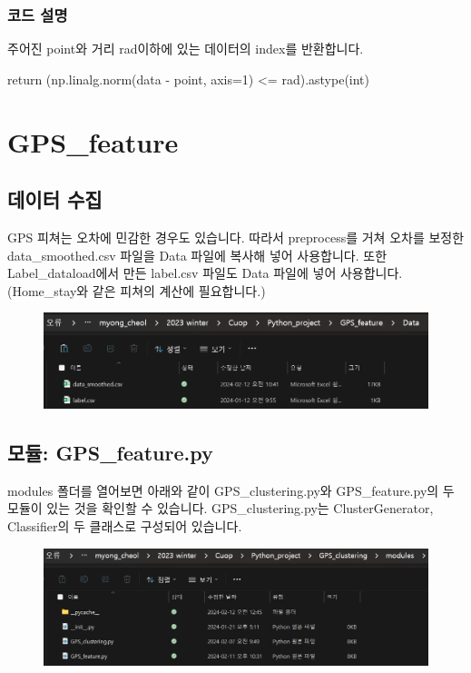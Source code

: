 \documentclass{oblivoir}
\begin{document}
  \subsection{코드 설명}
  주어진 point와 거리 rad이하에 있는 데이터의 index를 반환합니다.
  \begin{python}[label={GPS_clustering_26}]
    return (np.linalg.norm(data - point, axis=1) <= rad).astype(int)
  \end{python}

  \chapter{GPS\_feature}
  \setcounter{section}{0}
  \section{데이터 수집}
  GPS 피쳐는 오차에 민감한 경우도 있습니다. 따라서 preprocess를 거쳐 오차를 보정한 data\_smoothed.csv 파일을 Data 파일에 복사해 넣어 사용합니다.
  또한 Label\_dataload에서 만든 label.csv 파일도 Data 파일에 넣어 사용합니다.(Home\_stay와 같은 피쳐의 계산에 필요합니다.)
  \begin{figure}[H]
    \includegraphics[width=\textwidth]{GPS_feature_1.png}
  \end{figure}

  \section{모듈: GPS\_feature.py}
  modules 폴더를 열어보면 아래와 같이 GPS\_clustering.py와 GPS\_feature.py의 두 모듈이 있는 것을 확인할 수 있습니다.
  GPS\_clustering.py는 ClusterGenerator, Classifier의 두 클래스로 구성되어 있습니다.
  \begin{figure}[H]
    \includegraphics[width=\textwidth]{GPS_clustering_1.png}
  \end{figure}
\end{document}
